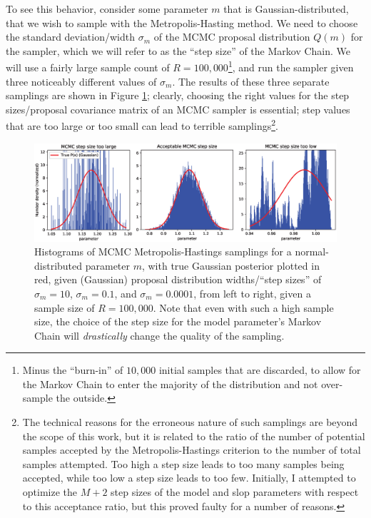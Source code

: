 To see this behavior, consider some parameter $m$ that is Gaussian-distributed, that we wish to sample with the Metropolis-Hasting method. We need to choose the standard deviation/width $\sigma_m$ of the MCMC proposal distribution $Q(m)$ for the sampler, which we will refer to as the ``step size'' of the Markov Chain. We will use a fairly large sample count of $R=100,000$\footnote{Minus the ``burn-in'' of $10,000$ initial samples that are discarded, to allow for the Markov Chain to enter the majority of the distribution and not over-sample the outside.}, and run the sampler given three noticeably different values of $\sigma_m$. The results of these three separate samplings are shown in Figure \ref{fig:mcmcstepsize}; clearly, choosing the right values for the step sizes/proposal covariance matrix of an MCMC sampler is essential; step values that are too large or too small can lead to terrible samplings\footnote{The technical reasons for the erroneous nature of such samplings are beyond the scope of this work, but it is related to the  ratio of the number of potential samples accepted by the Metropolis-Hastings criterion to the number of total samples attempted. Too high a step size leads to too many samples being accepted, while too low a step size leads to too few. Initially, I attempted to optimize the $M+2$ step sizes of the model and slop parameters with respect to this acceptance ratio, but this proved faulty for a number of reasons.}.
\begin{figure}
    \centering
    \includegraphics[width=1.0\linewidth]{figures/mcmcstepsizeall.eps}
    \caption{Histograms of MCMC Metropolis-Hastings samplings for a normal-distributed parameter $m$, with true Gaussian posterior plotted in red, given (Gaussian) proposal distribution widths/``step sizes'' of $\sigma_m=10$, $\sigma_m=0.1$, and $\sigma_m=0.0001$, from left to right, given a sample size of $R=100,000$. Note that even with such a high sample size, the choice of the step size for the model parameter's Markov Chain will \textit{drastically} change the quality of the sampling.}
    \label{fig:mcmcstepsize}
\end{figure}
